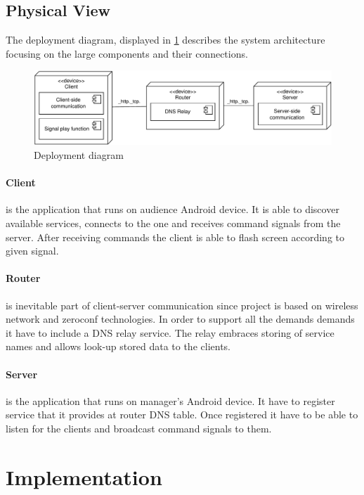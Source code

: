\subsection{Physical View}
The deployment diagram, displayed in \ref{fig:deployment_diagram} describes the system architecture focusing on the large components and their connections.

\begin{figure}[H]
	\centering
		\includegraphics[width=15cm]{images/deployment-diagram-sprint1}
	\caption{Deployment diagram}
	\label{fig:deployment_diagram}
\end{figure}

\paragraph{Client}
is the application that runs on audience Android device. It is able to discover available services, connects to the one and receives command signals from the server. After receiving commands the client is able to flash screen according to given signal.

\paragraph{Router}
is inevitable part of client-server communication since project is based on wireless network and zeroconf technologies. In order to support all the demands demands it have to include a DNS relay service. The relay embraces storing of service names and allows look-up stored data to the clients.

\paragraph{Server}
is the application that runs on manager's Android device. It have to register service that it provides at router DNS table. Once registered it have to be able to listen for the clients and broadcast command signals to them.


\section{Implementation}


